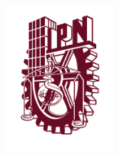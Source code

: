\documentclass[12pt, a4paper, titlepage]{article}
\begin{document}
	
	\begin{titlepage}
		
		\vspace*{-1.5in}
		\begin{figure}[htb]
			\begin{center}
				\includegraphics[width=4cm]{./imagenes/logoipn.png}
			\end{center}
		\end{figure}
		

\end{titlepage}
\end{document}
